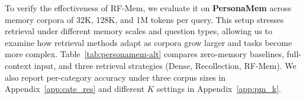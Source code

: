 


To verify the effectiveness of RF-Mem, we evaluate it on \textbf{PersonaMem} across memory corpora of 32K, 128K, and 1M tokens per query. This setup stresses retrieval under different memory scales and question types, allowing us to examine how retrieval methods adapt as corpora grow larger and tasks become more complex. Table~\ref{tab:personamem-alt} compares zero-memory baselines, full-context input, and three retrieval strategies (Dense, Recollection, RF-Mem). 
We also report per-category accuracy under three corpus sizes in Appendix~\ref{app:cate_res} and different $K$ settings in Appendix~\ref{app:pm_k}.

